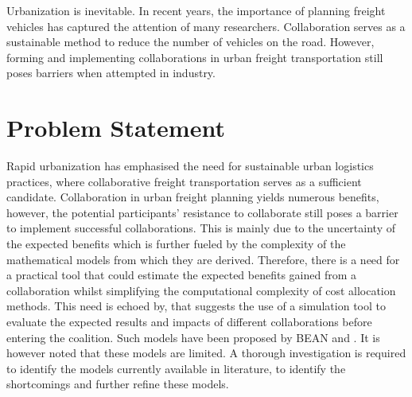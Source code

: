 Urbanization is inevitable. In recent years, the importance of planning freight vehicles has captured the attention of many researchers. Collaboration serves as a sustainable method to reduce the number of vehicles on the road. However, forming and implementing collaborations in urban freight transportation still poses barriers when attempted in industry.

\section{Problem Statement}
Rapid urbanization has emphasised the need for sustainable urban logistics practices, where collaborative freight transportation serves as a sufficient candidate. Collaboration in urban freight planning yields numerous benefits, however, the potential participants' resistance to collaborate still poses a barrier to implement successful collaborations. This is mainly due to the uncertainty of the expected benefits which is further fueled by the complexity of the mathematical models from which they are derived. Therefore, there is a need for a practical tool that could estimate the expected benefits gained from a collaboration whilst simplifying the computational complexity of cost allocation methods. This need is echoed by, \citet{cruijssen2007horizontal} that suggests the use of a simulation tool to evaluate the expected results and impacts of different collaborations before entering the coalition. Such models have been proposed by BEAN and \citet{schroeder2012towards}. It is however noted that these models are limited. A thorough investigation is required to identify the models currently available in literature, to identify the shortcomings and further refine these models. \par


